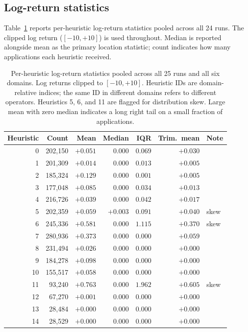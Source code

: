 \documentclass[11pt,a4paper]{article}
\begin{document}
\subsection{Log-return statistics}

Table~\ref{tab:logreturns} reports per-heuristic log-return statistics pooled across
all 24 runs. The clipped log return ($[-10,+10]$) is used throughout. Median is
reported alongside mean as the primary location statistic; count indicates how many
applications each heuristic received.

\begin{table}[h]
\centering
\small
\begin{tabular}{rrrrrrl}
\toprule
Heuristic & Count & Mean & Median & IQR & Trim.\ mean & Note \\
\midrule
 0 & 202{,}150 & $+0.051$ & $0.000$ & $0.069$ & $+0.030$ & \\
 1 & 201{,}309 & $+0.014$ & $0.000$ & $0.013$ & $+0.005$ & \\
 2 & 185{,}324 & $+0.129$ & $0.000$ & $0.001$ & $+0.005$ & \\
 3 & 177{,}048 & $+0.085$ & $0.000$ & $0.034$ & $+0.013$ & \\
 4 & 216{,}726 & $+0.039$ & $0.000$ & $0.042$ & $+0.017$ & \\
 5 & 202{,}359 & $+0.059$ & $+0.003$ & $0.091$ & $+0.040$ & skew \\
 6 & 245{,}336 & $+0.581$ & $0.000$ & $1.115$ & $+0.370$ & skew \\
 7 & 280{,}936 & $+0.373$ & $0.000$ & $0.000$ & $+0.059$ & \\
 8 & 231{,}494 & $+0.026$ & $0.000$ & $0.000$ & $+0.000$ & \\
 9 & 184{,}278 & $+0.098$ & $0.000$ & $0.000$ & $+0.000$ & \\
10 & 155{,}517 & $+0.058$ & $0.000$ & $0.000$ & $+0.000$ & \\
11 &  93{,}240 & $+0.763$ & $0.000$ & $1.962$ & $+0.605$ & skew \\
12 &  67{,}270 & $+0.001$ & $0.000$ & $0.000$ & $+0.000$ & \\
13 &  28{,}484 & $+0.000$ & $0.000$ & $0.000$ & $+0.000$ & \\
14 &  28{,}529 & $+0.000$ & $0.000$ & $0.000$ & $+0.000$ & \\
\bottomrule
\end{tabular}
\caption{Per-heuristic log-return statistics pooled across all 25 runs and all
six domains. Log returns clipped to $[-10,+10]$. Heuristic IDs are
domain-relative indices; the same ID in different domains refers to different
operators. Heuristics 5, 6, and 11 are flagged for distribution skew. Large mean
with zero median indicates a long right tail on a small fraction of applications.}
\label{tab:logreturns}
\end{table}
\end{document}
